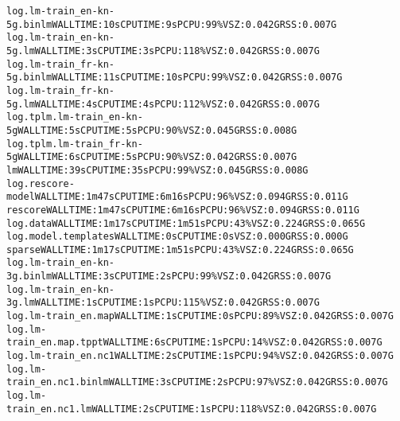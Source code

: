 \documentclass[11pt,letterpaper]{article}
\begin{document}
\begin{tiny}
\begin{alltt}
         log.lm-train_en-kn-5g.binlm                      WALL TIME: 10s      CPU TIME: 9s        PCPU: 99\%    VSZ: 0.042G    RSS: 0.007G
         log.lm-train_en-kn-5g.lm                         WALL TIME: 3s       CPU TIME: 3s        PCPU: 118\%   VSZ: 0.042G    RSS: 0.007G
         log.lm-train_fr-kn-5g.binlm                      WALL TIME: 11s      CPU TIME: 10s       PCPU: 99\%    VSZ: 0.042G    RSS: 0.007G
         log.lm-train_fr-kn-5g.lm                         WALL TIME: 4s       CPU TIME: 4s        PCPU: 112\%   VSZ: 0.042G    RSS: 0.007G
         log.tplm.lm-train_en-kn-5g                       WALL TIME: 5s       CPU TIME: 5s        PCPU: 90\%    VSZ: 0.045G    RSS: 0.008G
         log.tplm.lm-train_fr-kn-5g                       WALL TIME: 6s       CPU TIME: 5s        PCPU: 90\%    VSZ: 0.042G    RSS: 0.007G
      lm                                                  WALL TIME: 39s      CPU TIME: 35s       PCPU: 99\%    VSZ: 0.045G    RSS: 0.008G
         log.rescore-model                                WALL TIME: 1m47s    CPU TIME: 6m16s     PCPU: 96\%    VSZ: 0.094G    RSS: 0.011G
      rescore                                             WALL TIME: 1m47s    CPU TIME: 6m16s     PCPU: 96\%    VSZ: 0.094G    RSS: 0.011G
         log.data                                         WALL TIME: 1m17s    CPU TIME: 1m51s     PCPU: 43\%    VSZ: 0.224G    RSS: 0.065G
         log.model.templates                              WALL TIME: 0s       CPU TIME: 0s                     VSZ: 0.000G    RSS: 0.000G
      sparse                                              WALL TIME: 1m17s    CPU TIME: 1m51s     PCPU: 43\%    VSZ: 0.224G    RSS: 0.065G
         log.lm-train_en-kn-3g.binlm                      WALL TIME: 3s       CPU TIME: 2s        PCPU: 99\%    VSZ: 0.042G    RSS: 0.007G
         log.lm-train_en-kn-3g.lm                         WALL TIME: 1s       CPU TIME: 1s        PCPU: 115\%   VSZ: 0.042G    RSS: 0.007G
         log.lm-train_en.map                              WALL TIME: 1s       CPU TIME: 0s        PCPU: 89\%    VSZ: 0.042G    RSS: 0.007G
         log.lm-train_en.map.tppt                         WALL TIME: 6s       CPU TIME: 1s        PCPU: 14\%    VSZ: 0.042G    RSS: 0.007G
         log.lm-train_en.nc1                              WALL TIME: 2s       CPU TIME: 1s        PCPU: 94\%    VSZ: 0.042G    RSS: 0.007G
         log.lm-train_en.nc1.binlm                        WALL TIME: 3s       CPU TIME: 2s        PCPU: 97\%    VSZ: 0.042G    RSS: 0.007G
         log.lm-train_en.nc1.lm                           WALL TIME: 2s       CPU TIME: 1s        PCPU: 118\%   VSZ: 0.042G    RSS: 0.007G

\end{alltt}
\end{tiny}
\end{document}
